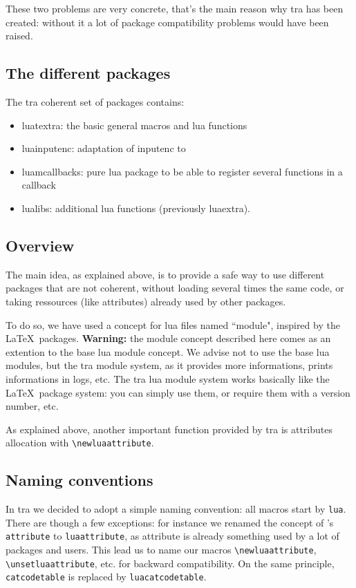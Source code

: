 \documentclass{article}
\newcommand\pf{\textsf}
\newcommand\code{\texttt}
\begin{document}
These two problems are very concrete, that's the main reason why \LuaTeX tra
has been created: without it a lot of package compatibility problems would
have been raised.

\subsection{The different packages}

The \LuaTeX tra coherent set of packages contains:

\begin{itemize}
  \item \pf{luatextra}: the basic general macros and lua functions
  \item \pf{luainputenc}: adaptation of \pf{inputenc} to \LuaTeX
  \item \pf{luamcallbacks}: pure lua package to be able to register
    several functions in a callback
  \item \pf{lualibs}: additional lua functions (previously
    \pf{luaextra}).
\end{itemize}

\subsection{Overview}

The main idea, as explained above, is to provide a safe way to use different
packages that are not coherent, without loading several times the same code,
or taking ressources (like attributes) already used by other packages.

To do so, we have used a concept for lua files named ``module", inspired by
the \LaTeX\ packages. \textbf{Warning:} the module concept described here
comes as an extention to the base lua module concept. We advise not to use the
base lua modules, but the \LuaTeX tra module system, as it provides more
informations, prints informations in logs, etc. The \LuaTeX tra lua module
system works basically like the \LaTeX\ package system: you can simply use
them, or require them with a version number, etc.

As explained above, another important function provided by \LuaTeX tra is
attributes allocation with \verb+\newluaattribute+.

\subsection{Naming conventions}

In \LuaTeX tra we decided to adopt a simple naming convention: all macros
start by \code{lua}. There are though a few exceptions: for instance we
renamed the concept of \LuaTeX 's \code{attribute} to \code{luaattribute},
as attribute is already something used by a lot of packages and users. This
lead us to name our macros \verb+\newluaattribute+,
\verb+\unsetluaattribute+, etc. for backward compatibility. On the
same principle, \code{catcodetable} is replaced by \code{luacatcodetable}.
\end{document}
